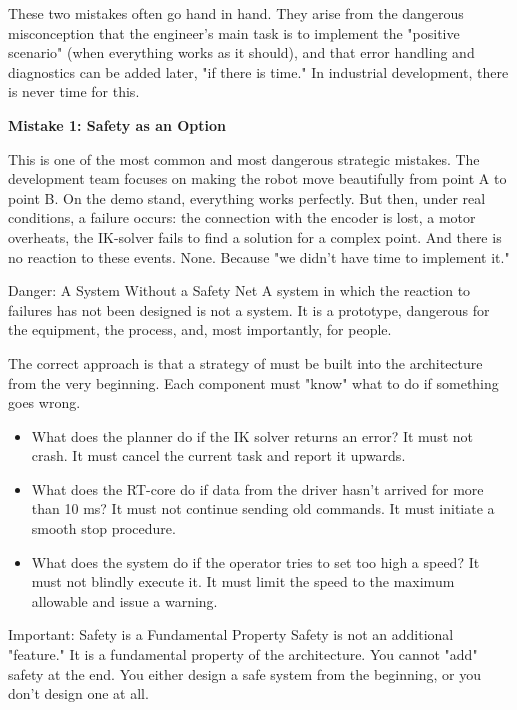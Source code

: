 These two mistakes often go hand in hand. They arise from the dangerous misconception that the engineer's main task is to implement the "positive scenario" (when everything works as it should), and that error handling and diagnostics can be added later, "if there is time." In industrial development, there is never time for this.

\textbf{Mistake 1: Safety as an Option}

This is one of the most common and most dangerous strategic mistakes. The development team focuses on making the robot move beautifully from point A to point B. On the demo stand, everything works perfectly. But then, under real conditions, a failure occurs: the connection with the encoder is lost, a motor overheats, the IK-solver fails to find a solution for a complex point. And there is no reaction to these events. None. Because "we didn't have time to implement it."

\begin{dangerbox}{Danger: A System Without a Safety Net}
A system in which the reaction to failures has not been designed is not a system. It is a prototype, dangerous for the equipment, the process, and, most importantly, for people.
\end{dangerbox}

The correct approach is that a strategy of  must be built into the architecture from the very beginning. Each component must "know" what to do if something goes wrong.
\begin{itemize}
    \item What does the planner do if the IK solver returns an error? It must not crash. It must cancel the current task and report it upwards.
    \item What does the RT-core do if data from the driver hasn't arrived for more than 10 ms? It must not continue sending old commands. It must initiate a smooth stop procedure.
    \item What does the system do if the operator tries to set too high a speed? It must not blindly execute it. It must limit the speed to the maximum allowable and issue a warning.
\end{itemize}

\begin{principlebox}{Important: Safety is a Fundamental Property}
Safety is not an additional "feature." It is a fundamental property of the architecture. You cannot "add" safety at the end. You either design a safe system from the beginning, or you don't design one at all.
\end{principlebox}

